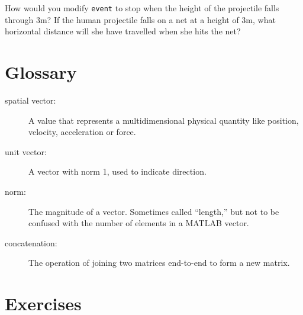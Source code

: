 \documentclass[
]{book}
\begin{document}
\begin{ex}
How would you modify {\tt event} to stop when the height of
the projectile falls through 3m?
If the human projectile falls on a net at a height of 3m, what
horizontal distance will she have travelled when she hits the
net?
\end{ex}

\section{Glossary}

\begin{description}

\item[spatial vector:] A value that represents a
multidimensional physical quantity like position, velocity,
acceleration or force.

\item[unit vector:] A vector with norm 1, used to indicate
direction.

\item[norm:] The magnitude of a vector.  Sometimes called ``length,''
but not to be confused with the number of elements in a MATLAB
vector.
\item[concatenation:] The operation of joining two matrices end-to-end to
form a new matrix.


\end{description}

\section{Exercises}
\end{document}
